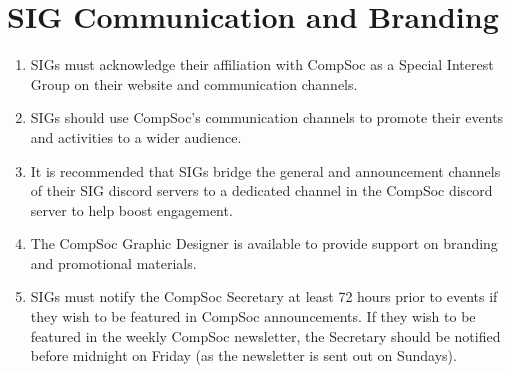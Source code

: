 \section{SIG Communication and Branding}
\begin{enumerate}
\item SIGs must acknowledge their affiliation with CompSoc as a Special Interest Group on their website and communication channels.
\item SIGs should use CompSoc's communication channels to promote their events and activities to a wider audience.
\item It is recommended that SIGs bridge the general and announcement channels of their SIG discord servers to a dedicated channel in the CompSoc discord server to help boost engagement.
\item The CompSoc Graphic Designer is available to provide support on branding and promotional materials.
\item SIGs must notify the CompSoc Secretary at least 72 hours prior to events if they wish to be featured in CompSoc announcements. If they wish to be featured in the weekly CompSoc newsletter, the Secretary should be notified before midnight on Friday (as the newsletter is sent out on Sundays).
\end{enumerate}